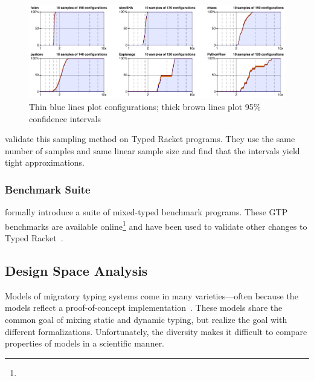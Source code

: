 \begin{figure}[t]
  \includegraphics[width=\columnwidth]{src/sampling.png}
  \caption{Thin blue lines plot  configurations; thick brown lines plot 95\% confidence intervals}
  \label{fig:sampling}
\end{figure}

\citet{gtnffvf-jfp-2019} validate this sampling method on Typed Racket
 programs.
They use the same number of samples and same linear sample size and find
 that the intervals yield tight approximations.



\subsubsection{Benchmark Suite}

\citet{gtnffvf-jfp-2019} formally introduce a suite of mixed-typed benchmark
 programs.
These GTP benchmarks are available online\footnote{}
 and have been used to validate other changes to Typed Racket~\cite{gf-icfp-2018,bbst-oopsla-2017}.


\subsection{Design Space Analysis}

Models of migratory typing systems come in many varieties---often because
 the models reflect a proof-of-concept implementation~\cite{bat-ecoop-2014,rtsf-sac-2013,rsfbv-popl-2015,acftd-scp-2013,cvgrl-oopsla-2017,mmi-dls-2015,bdt-esop-2016,wnlov-popl-2010,mt-oopsla-2017,vss-popl-2017,tf-popl-2008,clzv-ecoop-2018}.
These models share the common goal of mixing static and dynamic typing,
 but realize the goal with different formalizations.
Unfortunately, the diversity makes it difficult to compare properties of
 models in a scientific manner.

